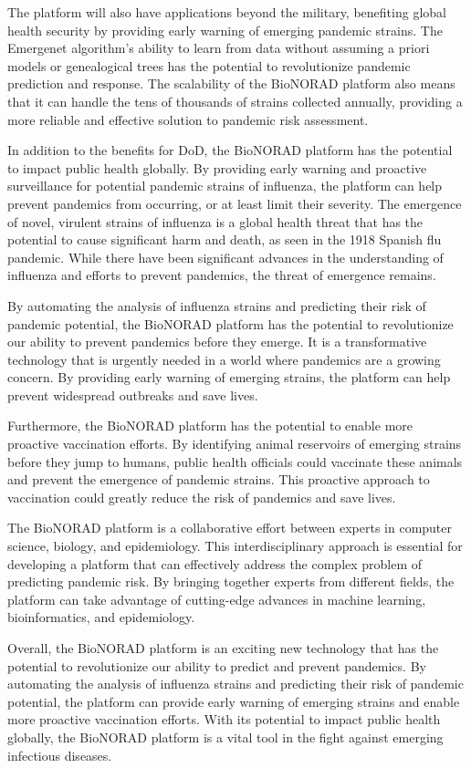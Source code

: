 \documentclass[onecolumn, compsoc,12pt]{IEEEtran}
\begin{document}
The platform will also have applications beyond the military, benefiting global health security by providing early warning of emerging pandemic strains. The Emergenet algorithm's ability to learn from data without assuming a priori models or genealogical trees has the potential to revolutionize pandemic prediction and response. The scalability of the BioNORAD platform also means that it can handle the tens of thousands of strains collected annually, providing a more reliable and effective solution to pandemic risk assessment.


In addition to the benefits for DoD, the BioNORAD platform has the potential to impact public health globally. By providing early warning and proactive surveillance for potential pandemic strains of influenza, the platform can help prevent pandemics from occurring, or at least limit their severity. The emergence of novel, virulent strains of influenza is a global health threat that has the potential to cause significant harm and death, as seen in the 1918 Spanish flu pandemic. While there have been significant advances in the understanding of influenza and efforts to prevent pandemics, the threat of emergence remains.

By automating the analysis of influenza strains and predicting their risk of pandemic potential, the BioNORAD platform has the potential to revolutionize our ability to prevent pandemics before they emerge. It is a transformative technology that is urgently needed in a world where pandemics are a growing concern. By providing early warning of emerging strains, the platform can help prevent widespread outbreaks and save lives.

Furthermore, the BioNORAD platform has the potential to enable more proactive vaccination efforts. By identifying animal reservoirs of emerging strains before they jump to humans, public health officials could vaccinate these animals and prevent the emergence of pandemic strains. This proactive approach to vaccination could greatly reduce the risk of pandemics and save lives.

The BioNORAD platform is a collaborative effort between experts in computer science, biology, and epidemiology. This interdisciplinary approach is essential for developing a platform that can effectively address the complex problem of predicting pandemic risk. By bringing together experts from different fields, the platform can take advantage of cutting-edge advances in machine learning, bioinformatics, and epidemiology.

Overall, the BioNORAD platform is an exciting new technology that has the potential to revolutionize our ability to predict and prevent pandemics. By automating the analysis of influenza strains and predicting their risk of pandemic potential, the platform can provide early warning of emerging strains and enable more proactive vaccination efforts. With its potential to impact public health globally, the BioNORAD platform is a vital tool in the fight against emerging infectious diseases.
\end{document}
